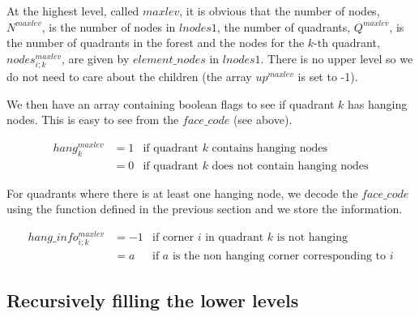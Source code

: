At the highest level, called $maxlev$, it is obvious that the number of nodes, $N^{maxlev}$, is the number of nodes in $lnodes1$, the number of quadrants, $Q^{maxlev}$, is the number of quadrants in the forest and the nodes for the $k$-th quadrant, $nodes^{maxlev}_{i;k}$, are given by $element\_nodes$ in $lnodes1$. There is no upper level so we do not need to care about the children (the array $up^{maxlev}$ is set to -1).

We then have an array containing boolean flags to see if quadrant $k$ has hanging nodes. This is easy to see from the $face\_code$ (see above).

\begin{align*}
hang_k^{maxlev} &= 1 &\text{if quadrant $k$ contains hanging nodes}\\
&= 0 &\text{if quadrant $k$ does not contain hanging nodes} 
\end{align*} 

For quadrants where there is at least one hanging node, we decode the $face\_code$ using the function defined in the previous section and we store the information. 

\begin{align*}
hang\_info^{maxlev}_{i;k} &= -1 &\text{if corner $i$ in quadrant $k$ is not hanging}\\
 &= a &\text{if $a$ is the non hanging corner corresponding to $i$}
\end{align*}

\subsection{Recursively filling the lower levels}


